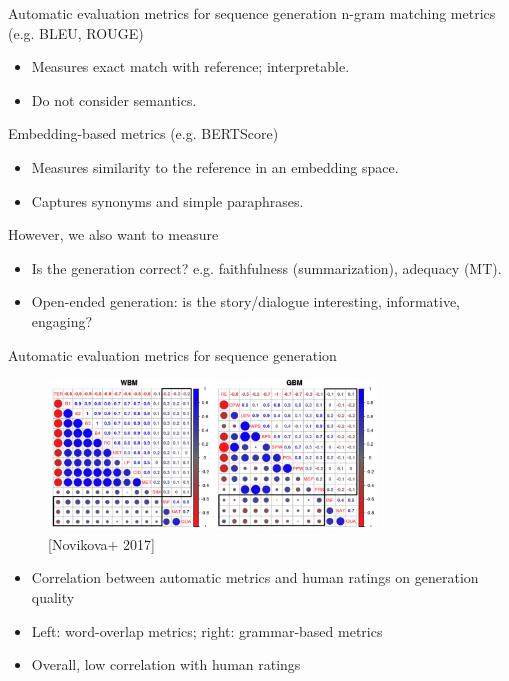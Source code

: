 \documentclass[usenames,dvipsnames,11pt,aspectratio=169]{beamer}
\begin{document}
\begin{frame}
    {Automatic evaluation metrics for sequence generation}
    n-gram matching metrics (e.g. BLEU, ROUGE)\\
    \begin{itemize}
        \item Measures exact match with reference; interpretable.
        \item Do not consider semantics.
    \end{itemize}

    Embedding-based metrics (e.g. BERTScore)\\
    \begin{itemize}
        \item Measures similarity to the reference in an embedding space.
        \item Captures synonyms and simple paraphrases.
    \end{itemize}

    However, we also want to measure\\
    \begin{itemize}
        \item Is the generation correct? e.g. faithfulness (summarization), adequacy (MT).
        \item Open-ended generation: is the story/dialogue interesting, informative, engaging?
    \end{itemize}
\end{frame}

\begin{frame}
    {Automatic evaluation metrics for sequence generation}
    \begin{figure}
        \includegraphics[height=4cm]{figures/auto-eval}
        \caption{[Novikova+ 2017]}
    \end{figure}
    \vspace{-1em}
    \begin{itemize}
        \item Correlation between automatic metrics and human ratings on generation quality
        \item Left: word-overlap metrics; right: grammar-based metrics
        \item Overall, low correlation with human ratings
    \end{itemize}
\end{frame}
\end{document}
